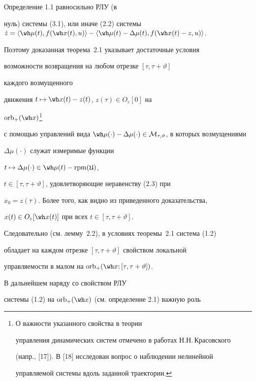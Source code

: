 \begin{notes}


Определение 1.1 равносильно РЛУ (в


нуль) системы (3.1), или иначе (2.2) системы $\Dot z=


\langle\wh\mu(t),f(\wh x(t),u)\rangle-


\langle\wh\mu(t)-\Delta\mu(t),f(\wh x(t)-z,u)\rangle$.


Поэтому доказанная теорема~2.1 указывает достаточные условия 


возможности возвращения на любом отрезке $[\tau,\tau+\vartheta]$ 


каждого возмущенного


движения $t\mapsto\wh x(t)-z(t)$, $z(\tau)\in O_\varepsilon[0]$ на


$\orb_+(\wh x)$\;\footnote{О важности указанного свойства в теории


управления динамических систем отмечено в работах Н.Н.\,Красовского


(напр., [17]). В [18] исследован вопрос о наблюдении нелинейной


управляемой системы вдоль заданной траектории.}


с помощью управлений вида $\wh\mu(\cdot)-\Delta\mu(\cdot)


\in\cal M_{\tau,\vartheta}$, в которых возмущениями


$\Delta\mu(\cdot)$ служат измеримые функции


$t\mapsto\Delta\mu(\cdot)\in\wh\mu(t)-\rpm(\frak U)$,


$t\in[\tau,\tau+\vartheta]$, удовлетворяющие неравенству (2.3) при


$x_0=z(\tau)$. Более того, как видно из приведенного доказательства,


$x(t)\in O_\varepsilon[\wh x(t)]$ при всех $t\in[\tau,\tau+\vartheta]$.


Следовательно (см. лемму~2.2), в условиях теоремы~2.1 система (1.2)


обладает на каждом отрезке $[\tau,\tau+\vartheta]$ свойством локальной


управляемости в малом на $\orb_+(\wh x;[\tau,\tau+\vartheta])$.


\end{notes}





В дальнейшем наряду со свойством РЛУ


системы (1.2) на $\orb_+(\wh x)$ (см. определение 2.1) важную роль


